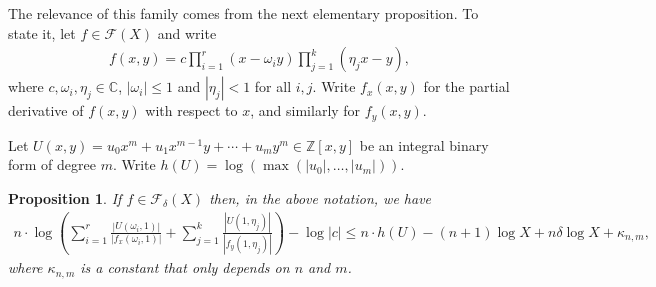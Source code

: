\documentclass{article} %
\newtheorem{proposition}{Proposition}[section]
\numberwithin{equation}{section}
\newcommand{\Z}{\mathbb{Z}}
\begin{document}
The relevance of this family comes from the next elementary proposition. 
To state it, let $f\in \mathcal{F}(X)$ and write
\begin{align}\label{eq_realdecompositionpoly}
    f(x,y) = c \prod_{i=1}^r (x-\omega_iy) \prod_{j=1}^k (\eta_jx-y), 
\end{align}
where $c, \omega_i,\eta_j\in \mathbb{C}$, $|\omega_i|\leq 1$ and $|\eta_j|<1$ for all $i,j$.
Write $f_x(x,y)$ for the partial derivative of $f(x,y)$ with respect to $x$, and similarly for $f_y(x,y)$.

Let $U(x,y)  = u_0 x^{m} + u_1x^{m-1} y + \cdots + u_{m}y^m\in \Z[x,y]$ be an integral binary form of degree $m$. 
Write $h(U) = \log(\max(|u_0|, \dots,|u_m|))$.


\begin{proposition}\label{prop_massagingformuladensity1family}
    If $f\in \mathcal{F}_{\delta}(X)$ then, in the above notation, we have
    \begin{align}\label{equation: upper bound formula density 1 family}
        n\cdot \log\left(\sum_{i=1}^r \frac{|U(\omega_i,1)|}{|f_x(\omega_i,1)|}
        +\sum_{j=1}^k \frac{|U(1,\eta_j)|}{|f_y(1,\eta_j)|}\right) - \log |c| 
        \leq n\cdot h(U) - (n+1)\log X +  n \delta \log X + \kappa_{n,m},
    \end{align}
    where $\kappa_{n,m}$ is a constant that only depends on $n$ and $m$.
\end{proposition}
\end{document}
